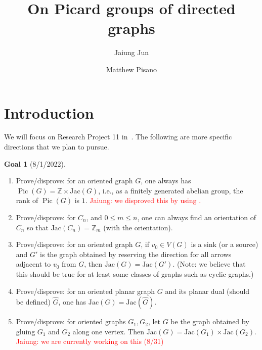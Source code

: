 \documentclass[11pt,reqno]{amsart}
\DeclareMathOperator{\Pic}{Pic}
\newcommand{\Jac}{\textrm{Jac}}{}
\theoremstyle{definition}
\newtheorem*{goal}{\textbf{Goal}}
\theoremstyle{plain}
\begin{document}
\title{On Picard groups of directed graphs}
%

\author{Jaiung Jun}
\address{Department of Mathematics, State University of New York at New Paltz, NY 12561, USA}

\author{Matthew Pisano}
\address{Department of Mathematics, State University of New York at New Paltz, NY 12561, USA}


%

%
\makeatletter
{}
\makeatother


\begin{abstract}

\end{abstract}

\maketitle


\section{Introduction}

	We will focus on Research Project 11 in~\cite{glass2020chip}.
	The following are more specific directions that we plan to pursue.

	\begin{goal}[8/1/2022]$ $
		\begin{enumerate}
			\item
			Prove/disprove: for an oriented graph $G$, one always has $\Pic(G)=\mathbb{Z} \times \Jac(G)$, 
			i.e., as a finitely generated abelian group, the rank of $\Pic(G)$ is $1$. \textcolor{red}{Jaiung: we disproved this by using \cite{wagner2000critical}.}
			\item
			Prove/disprove: for $C_n$, and $0 \leq m \leq n$, one can always find an orientation
			of $C_n$ so that $\Jac(C_n)=\mathbb{Z}_m$ (with the orientation).
			\item
			Prove/disprove: for an oriented graph $G$, if $v_0 \in V(G)$ is a sink (or a source)
			and $G'$ is the graph obtained by reserving the direction for all arrows adjacent
			to $v_0$ from $G$, then $\Jac(G)=\Jac(G')$. (Note: we believe that this should be true
			for at least some classes of graphs such as cyclic graphs.)
			\item
			Prove/disprove: for an oriented planar graph $G$ and its planar dual (should be defined)
			$\hat{G}$, one has $\Jac(G)=\Jac(\hat{G})$.
			\item
			Prove/disprove: for oriented graphs $G_1,G_2$, let $G$ be the graph obtained by
			gluing $G_1$ and $G_2$ along one vertex. Then $\Jac(G)=\Jac(G_1) \times \Jac(G_2)$. \textcolor{red}{Jaiung: we are currently working on this (8/31)}
		\end{enumerate}
	\end{goal}
\end{document}
